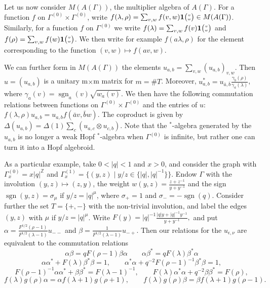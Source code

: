 \documentclass[10pt]{article}
\DeclareMathOperator{\sgn}{\mathrm{sgn}}
\newcommand{\Z}{\mathbb{Z}}
\newcommand{\Grt}[3]{#1{\tiny {\begin{pmatrix} #2\\#3\end{pmatrix}}}}
\newcommand{\UnitC}[2]{\Grt{\mathbf{1}}{#1}{#2}}
\theoremstyle{definition}
\numberwithin{equation}{section}
\begin{document}
Let us now consider $M(A(\Gamma))$, the multiplier algebra of $A(\Gamma)$. For a function $f$ on $\Gamma^{(0)}\times \Gamma^{(0)}$, write $f(\lambda,\rho) = \sum_{v,w} f(v,w)\UnitC{v}{w} \in M(A(\Gamma))$. Similarly, for a function $f$ on $\Gamma^{(0)}$ we write $f(\lambda) = \sum_{v,w} f(v)\UnitC{v}{w}$ and $f(\rho) = \sum_{v,w}f(w)\UnitC{v}{w}$. We then write for example $f(a\lambda,\rho)$ for the element corresponding to the function $(v,w)\mapsto f(av,w)$.

We can further form in $M(A(\Gamma))$ the elements $u_{a,b} = \sum_{v,w} (u_{a,b})_{v,w}$. Then $u=(u_{a,b})$ is a unitary m$\times$m matrix for $m=\#T$. Moreover, $u_{a,b}^* =  u_{\bar{a},\bar{b}}\frac{\gamma_b(\rho)}{\gamma_a(\lambda)}$, where $\gamma_a(v) = \sgn_a(v)\sqrt{w_a(v)}$. We then have the following commutation relations between functions on $\Gamma^{(0)}\times \Gamma^{(0)}$ and the entries of $u$: $f(\lambda,\rho)u_{a,b} = u_{a,b}f(\bar{a}v,\bar{b}w)$. The coproduct is given by $\Delta(u_{a,b}) = \Delta(1) \sum_c(u_{a,c}\otimes u_{c,b})$. Note that the $^*$-algebra generated by the $u_{a,b}$ is no longer a weak Hopf $^*$-algebra when $\Gamma^{(0)}$ is infinite, but rather one can turn it into a Hopf algebroid. %

As a particular example, take $0<|q|<1$ and $x>0$, and consider the graph with $\Gamma_x^{(0)} = x|q|^{\Z}$ and $\Gamma_x^{(1)} = \{(y,z)\mid y/z \in \{|q|,|q|^{-1}\}\}$. Endow $\Gamma$ with the involution $(y,z) \mapsto (z,y)$, the weight $w(y,z) = \frac{z+z^{-1}}{y+y^{-1}}$ and the sign $\sgn(y,z) = \sigma_{\mu}$ if $y/z = |q|^{\mu}$, where $\sigma_{+} = 1$ and $\sigma_- = -\sgn(q)$.  Consider further the set $T = \{+,-\}$ with the non-trivial involution, and label the edges $(y,z)$ with $\mu$ if $y/z = |q|^{\mu}$. Write $F(y) = |q|^{-1}\frac{|q|y+|q|^{-1}y^{-1}}{y+y^{-1}},$ and put $\alpha = \frac{F^{1/2}(\rho-1)}{F^{1/2}(\lambda-1)}u_{--}$ and $\beta = \frac{1}{F^{1/2}(\lambda-1)}u_{-+}.$ Then our relations for the $u_{\epsilon,\nu}$ are equivalent to the commutation relations \begin{equation}\label{EqqCom} \alpha \beta = qF(\rho-1)\beta\alpha \qquad \alpha\beta^* = qF(\lambda)\beta^*\alpha\end{equation} \begin{equation}\label{EqDet} \alpha\alpha^* +F(\lambda)\beta^*\beta = 1,\qquad \alpha^*\alpha+q^{-2}F(\rho-1)^{-1}\beta^*\beta = 1,\end{equation}\begin{equation*} F(\rho-1)^{-1}\alpha\alpha^* +\beta\beta^* = F(\lambda-1)^{-1},\qquad  F(\lambda)\alpha^*\alpha +q^{-2}\beta\beta^* = F(\rho),\end{equation*} \begin{equation}\label{EqGrad} f(\lambda)g(\rho)\alpha =
\alpha f(\lambda+1)g(\rho+1),\qquad f(\lambda)g(\rho)\beta = \beta f(\lambda+1)g(\rho-1).\end{equation}%
\end{document}
